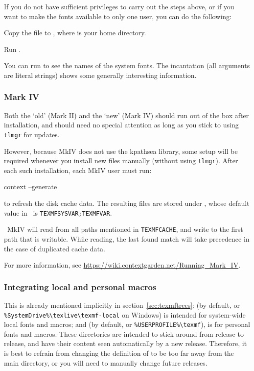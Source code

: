 \documentclass{article}
\begin{document}
If you do not have sufficient privileges to carry out the steps above,
or if you want to make the \TL{} fonts available to only one user,
you can do the following:
\begin{enumerate*}
\item Copy the  file to
      , where \filename{~} is your home directory.
\item Run .
\end{enumerate*}

You can run  to see the names of the system fonts.  The
incantation  (all arguments
are literal strings) shows some generally interesting information.


\subsubsection{\protect\ConTeXt{} Mark IV}
\label{sec:context-mkiv}

Both the `old' \ConTeXt{} (Mark II) and the `new' \ConTeXt{}
(Mark IV) should run out of the box after \TL{} installation,
and should need no special attention as long as you stick to
using \verb+tlmgr+ for updates.

However, because \ConTeXt{} MkIV does not use the kpathsea
library, some setup will be required whenever you install new 
files manually (without using \verb+tlmgr+). After each such 
installation, each MkIV user must run:
\begin{sverbatim}
context --generate
\end{sverbatim}
to refresh the \ConTeXt{} disk cache data.
The resulting files are stored under ,
whose default value in \TL\ is \verb+TEXMFSYSVAR;TEXMFVAR+. 

\ConTeXt\ MkIV will read from
all paths mentioned in \verb+TEXMFCACHE+, and write to the first
path that is writable. While reading, the last found match will 
take precedence in the case of duplicated cache data.

For more information, see
\url{https://wiki.contextgarden.net/Running_Mark_IV}.


\subsubsection{Integrating local and personal macros}
\label{sec:local-personal-macros}

This is already mentioned implicitly in section~\ref{sec:texmftrees}:
 (by default,
 or
\verb|%SystemDrive%\texlive\texmf-local| on Windows)
is intended for system-wide local fonts and macros; and
 (by default,  or
\verb|%USERPROFILE%\texmf|), is for personal fonts and macros.  These
directories are intended to stick around from release to release, and
have their content seen automatically by a new \TL{} release.
Therefore, it is best to refrain from changing the definition of
 to be too far away from the main \TL{} directory,
or you will need to manually change future releases.
\end{document}
